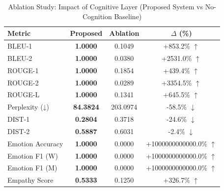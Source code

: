 \begin{table}[ht]
\centering
\caption{Ablation Study: Impact of Cognitive Layer (Proposed System vs No-Cognition Baseline)}
\label{tab:ablation}
\begin{tabular}{lccc}
\toprule
\textbf{Metric} & \textbf{Proposed} & \textbf{Ablation} & \textbf{$\Delta$ (\%)} \\
\midrule
BLEU-1 & \textbf{1.0000} & 0.1049 & +853.2\% $\uparrow$ \\
BLEU-2 & \textbf{1.0000} & 0.0380 & +2531.0\% $\uparrow$ \\
ROUGE-1 & \textbf{1.0000} & 0.1854 & +439.4\% $\uparrow$ \\
ROUGE-2 & \textbf{1.0000} & 0.0289 & +3354.5\% $\uparrow$ \\
ROUGE-L & \textbf{1.0000} & 0.1341 & +645.5\% $\uparrow$ \\
Perplexity (↓) & \textbf{84.3824} & 203.0974 & -58.5\% $\downarrow$ \\
DIST-1 & \textbf{0.2804} & 0.3718 & -24.6\% $\downarrow$ \\
DIST-2 & \textbf{0.5887} & 0.6031 & -2.4\% $\downarrow$ \\
Emotion Accuracy & \textbf{1.0000} & 0.0000 & +1000000000000.0\% $\uparrow$ \\
Emotion F1 (W) & \textbf{1.0000} & 0.0000 & +1000000000000.0\% $\uparrow$ \\
Emotion F1 (M) & \textbf{1.0000} & 0.0000 & +1000000000000.0\% $\uparrow$ \\
Empathy Score & \textbf{0.5333} & 0.1250 & +326.7\% $\uparrow$ \\
\bottomrule
\end{tabular}
\end{table}